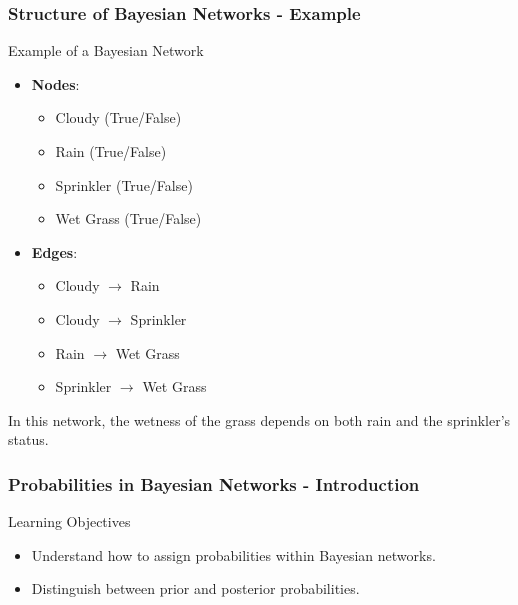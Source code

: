 \documentclass[aspectratio=169]{beamer}
\begin{document}
\begin{frame}[fragile]
    \frametitle{Structure of Bayesian Networks - Example}
    \begin{block}{Example of a Bayesian Network}
        \begin{itemize}
            \item \textbf{Nodes}:
                \begin{itemize}
                    \item Cloudy (True/False)
                    \item Rain (True/False)
                    \item Sprinkler (True/False)
                    \item Wet Grass (True/False)
                \end{itemize}
            \item \textbf{Edges}:
                \begin{itemize}
                    \item Cloudy $\rightarrow$ Rain
                    \item Cloudy $\rightarrow$ Sprinkler
                    \item Rain $\rightarrow$ Wet Grass
                    \item Sprinkler $\rightarrow$ Wet Grass
                \end{itemize}
        \end{itemize}
        In this network, the wetness of the grass depends on both rain and the sprinkler's status.
    \end{block}
\end{frame}

\begin{frame}[fragile]
    \frametitle{Probabilities in Bayesian Networks - Introduction}
    \begin{block}{Learning Objectives}
        \begin{itemize}
            \item Understand how to assign probabilities within Bayesian networks.
            \item Distinguish between prior and posterior probabilities.
        \end{itemize}
    \end{block}
\end{frame}
\end{document}
